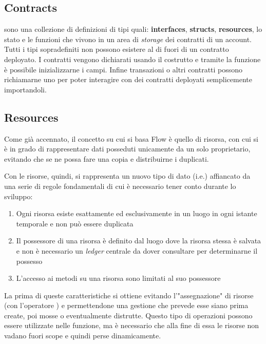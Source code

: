\subsection*{Contracts}
sono una collezione di definizioni di tipi quali: \textbf{interfaces}, \textbf{structs}, \textbf{resources}, lo stato e le funzioni che vivono in un area di \textit{storage} dei contratti di un account. Tutti i tipi sopradefiniti non possono esistere al di fuori di un contratto deployato. I contratti vengono dichiarati usando il costrutto  e tramite la funzione  è possibile inizializzarne i campi. Infine  transazioni o altri contratti possono richiamarne uno per poter interagire con dei contratti deployati semplicemente importandoli.

\subsection{Resources}\label{sez:resources}
Come già accennato, il concetto su cui si basa Flow è quello di risorsa, con cui si è in grado di rappresentare dati posseduti unicamente da un solo proprietario, evitando che se ne possa fare una copia e distribuirne i duplicati. 

Con le risorse, quindi, si rappresenta un nuovo tipo di dato (i.e.) affiancato da una serie di regole fondamentali di cui è necessario tener conto durante lo sviluppo:

\begin{enumerate}
    \item Ogni risorsa esiste esattamente ed esclusivamente in un luogo in ogni istante temporale e non può essere duplicata
    \item Il possessore di una risorsa è definito dal luogo dove la risorsa stessa è salvata e non è necessario un \textit{ledger} centrale da dover consultare per determinarne il possesso
    \item L'accesso ai metodi su una risorsa sono limitati al suo possessore
\end{enumerate}

La prima di queste caratteristiche si ottiene evitando l'"assegnazione" di risorse (con l'operatore \codeinline{=}) e permettendone una gestione che prevede esse siano prima create, poi mosse o eventualmente distrutte. Questo tipo di operazioni possono essere utilizzate nelle funzione, ma è necessario che alla fine di essa le risorse non vadano fuori scope e quindi perse dinamicamente.

